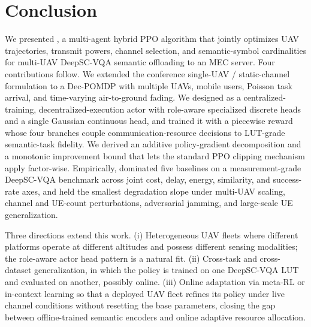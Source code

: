 \section{Conclusion}\label{sec:concl}

We presented \method, a multi-agent hybrid PPO algorithm that jointly
optimizes UAV trajectories, transmit powers, channel selection, and
semantic-symbol cardinalities for multi-UAV DeepSC-VQA semantic
offloading to an MEC server. Four contributions follow. We extended
the conference single-UAV / static-channel formulation to a Dec-POMDP
with multiple UAVs, mobile users, Poisson task arrival, and
time-varying air-to-ground fading. We designed \method as a
centralized-training, decentralized-execution actor with role-aware
specialized discrete heads and a single Gaussian continuous head, and
trained it with a piecewise reward whose four branches couple
communication-resource decisions to LUT-grade semantic-task fidelity.
We derived an additive policy-gradient decomposition and a monotonic
improvement bound that lets the standard PPO clipping mechanism apply
factor-wise. Empirically, \method dominated five baselines on a
measurement-grade DeepSC-VQA benchmark across joint cost, delay,
energy, similarity, and success-rate axes, and held the smallest
degradation slope under multi-UAV scaling, channel and UE-count
perturbations, adversarial jamming, and large-scale UE generalization.

Three directions extend this work. (i) Heterogeneous UAV fleets where
different platforms operate at different altitudes and possess
different sensing modalities; the role-aware actor head pattern is a
natural fit. (ii) Cross-task and cross-dataset generalization, in
which the policy is trained on one DeepSC-VQA LUT and evaluated on
another, possibly online. (iii) Online adaptation via meta-RL or
in-context learning so that a deployed UAV fleet refines its policy
under live channel conditions without resetting the base parameters,
closing the gap between offline-trained semantic encoders and online
adaptive resource allocation.
